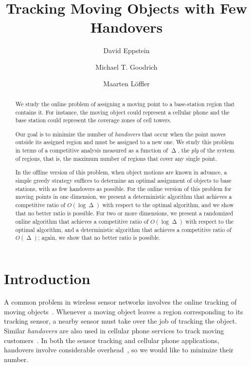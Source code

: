 \documentclass[runningheads]{llncs}
\title{Tracking Moving Objects with Few Handovers}
\author{David Eppstein \and Michael T. Goodrich \and Maarten L\"offler}
\institute{Dept. of Computer Science, Univ. of California, Irvine}
\date{}
\DeclareMathOperator {\ply}{\Delta}
\begin{document}
\maketitle

\begin {abstract}
We study the online problem of assigning a moving point 
to a base-station region that contains it. 
For instance, the moving object could represent a cellular phone and the base 
station could represent the coverage zones of 
cell towers. 

Our goal is to minimize the number of \emph{handovers} that occur when 
the point moves outside its assigned
region and must be assigned to a new one. 
We study this problem in terms of 
a competitive analysis measured
as a function of $\ply$, the \emph{ply} of 
the system of regions, that is, the maximum number of regions
that cover any single point. 

In the offline version of this problem,
when object motions are known in advance, a simple greedy strategy 
suffices to determine an optimal assignment of objects to base stations, 
with as few handovers as possible. 
For the online version of this problem for
moving points in one dimension, we present a deterministic 
algorithm that achieves a competitive ratio of $O(\log\ply)$ with
respect to the optimal algorithm, 
and we show that no better ratio is possible. 
For two or more dimensions, we present a randomized online 
algorithm that achieves a competitive ratio of $O(\log\ply)$ with
respect to the optimal algorithm, and a deterministic algorithm that achieves a competitive ratio of $O(\ply)$;
again, we show that no better ratio is possible.
\end {abstract}




\section {Introduction}
A common problem in wireless sensor networks involves the online
tracking of moving objects~\cite{aekd-tfmt-10,cysa-atdp-05,gtzts-stpea-10,hh-ttqw-05,ppk-eqttt-03,yz-mdot-09,zjr-iddsc-02}. 
Whenever a moving object leaves a region corresponding to its
tracking sensor, a nearby sensor  must take over the job of tracking the object.
Similar \emph{handovers} are also used in cellular phone services to track moving customers~\cite{tekinay1991handover}.
In both the sensor tracking and cellular phone applications, handovers involve considerable 
overhead~\cite{gtzts-stpea-10,hh-ttqw-05,ppk-eqttt-03, tekinay1991handover,zjr-iddsc-02},
so we would like to minimize their number.
\end{document}

